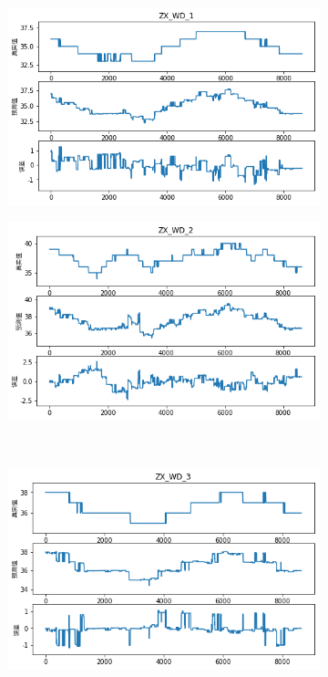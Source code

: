 \begin{figure}[H]
\centering
\begin{subfigure}[t]{0.48\textwidth}
    \centering
    \includegraphics[scale=0.45]{figures/sr/ffx-zx_wd_1.png}
\end{subfigure}\hfill
\begin{subfigure}[t]{0.48\textwidth}
    \centering
    \includegraphics[scale=0.45]{figures/sr/ffx-zx_wd_2.png}
\end{subfigure}\\
\begin{subfigure}[t]{0.48\textwidth}
  \centering
  \includegraphics[scale=0.45]{figures/sr/ffx-zx_wd_3.png}

\end{subfigure}
\end{figure}
